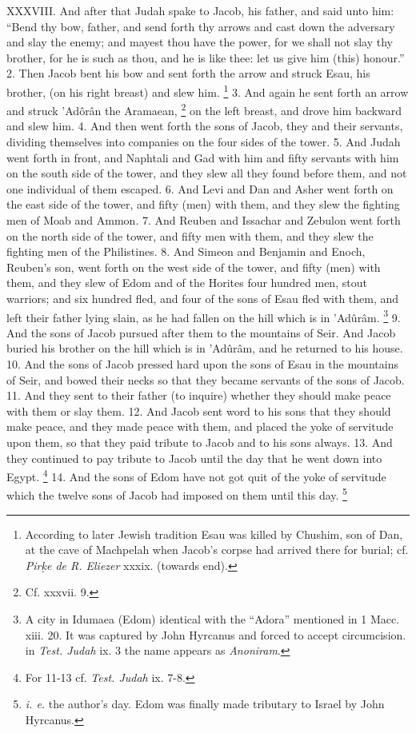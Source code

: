 XXXVIII. And after that Judah spake to Jacob, his father, and said unto him: ``Bend thy bow, father, and send forth thy arrows and cast down the adversary and slay the enemy; and mayest thou have the power, for we shall not slay thy brother, for he is such as thou, and he is like thee: let us give him (this) honour.'' 2. Then Jacob bent his bow and sent forth the arrow and struck Esau, his brother, (on his right breast) and slew him. \footnote{According to later Jewish tradition Esau was killed by Chushim, son of Dan, at the cave of Machpelah when Jacob's corpse had arrived there for burial; cf. \emph{Pir\d{k}e de R. Eliezer} xxxix. (towards end).} 3. And again he sent forth an arrow and struck ’Adôrân the Aramaean, \footnote{Cf. xxxvii. 9.} on the left breast, and drove him backward and slew him. 4. And then went forth the sons of Jacob, they and their servants, dividing themselves into companies on the four sides of the tower. 5. And Judah went forth in front, and Naphtali and Gad with him and fifty servants with him on the south side of the tower, and they slew all they found before them, and not one individual of them escaped. 6. And Levi and Dan and Asher went forth on the east side of the tower, and fifty (men) with them, and they slew the fighting men of Moab and Ammon. 7. And Reuben and Issachar and Zebulon went forth on the north side of the tower, and fifty men with them, and they slew the fighting men of the Philistines. 8. And Simeon and Benjamin and Enoch, Reuben's son, went forth on the west side of the tower, and fifty (men) with them, and they slew of Edom and of the Horites four hundred men, stout warriors; and six hundred fled, and four of the sons of Esau fled with them, and left their father lying slain, as he had fallen on the hill which is in ’Adûrâm. \footnote{A city in Idumaea (Edom) identical with the ``Adora'' mentioned in 1 Macc. xiii. 20. It was captured by John Hyrcanus and forced to accept circumcision. in \emph{Test. Judah} ix. 3 the name appears as \emph{Anoniram}.} 9. And the sons of Jacob pursued after them to the mountains of Seir. And Jacob buried his brother on the hill which is in ’Adûrâm, and he returned to his house. 10. And the sons of Jacob pressed hard upon the sons of Esau in the mountains of Seir, and bowed their necks so that they became servants of the sons of Jacob. 11. And they sent to their father (to inquire) whether they should make peace with them or slay them. 12. And Jacob sent word to his sons that they should make peace, and they made peace with them, and placed the yoke of servitude upon them, so that they paid tribute to Jacob and to his sons always. 13. And they continued to pay tribute to Jacob until the day that he went down into Egypt. \footnote{For 11-13 cf. \emph{Test. Judah} ix. 7-8.} 14. And the sons of Edom have not got quit of the yoke of servitude which the twelve sons of Jacob had imposed on them until this day. \footnote{\emph{i. e.} the author's day. Edom was finally made tributary to Israel by John Hyrcanus.}

